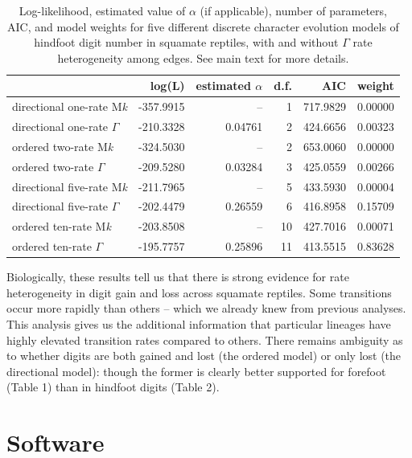 \documentclass[fleqn,10pt,lineno]{wlpeerj} %
\begin{document}
\begin{table}

\caption{\label{tab:unnamed-chunk-13}Log-likelihood, estimated value of $\alpha$ (if applicable), number of parameters, AIC, and model weights for five different discrete character evolution models of hindfoot digit number in squamate reptiles, with and without $\Gamma$ rate heterogeneity among edges. See main text for more details.}
\centering
\begin{tabular}[t]{l|r|r|r|r|r}
\hline
  & log(L) & estimated $\alpha$ & d.f. & AIC & weight\\
\hline
directional one-rate M\emph{k} & -357.9915 & -- & 1 & 717.9829 & 0.00000\\
\hline
directional one-rate $\Gamma$ & -210.3328 & 0.04761 & 2 & 424.6656 & 0.00323\\
\hline
ordered two-rate M\emph{k} & -324.5030 & -- & 2 & 653.0060 & 0.00000\\
\hline
ordered two-rate $\Gamma$ & -209.5280 & 0.03284 & 3 & 425.0559 & 0.00266\\
\hline
directional five-rate M\emph{k} & -211.7965 & -- & 5 & 433.5930 & 0.00004\\
\hline
directional five-rate $\Gamma$ & -202.4479 & 0.26559 & 6 & 416.8958 & 0.15709\\
\hline
ordered ten-rate M\emph{k} & -203.8508 & -- & 10 & 427.7016 & 0.00071\\
\hline
ordered ten-rate $\Gamma$ & -195.7757 & 0.25896 & 11 & 413.5515 & 0.83628\\
\hline
\end{tabular}
\end{table}

Biologically, these results tell us that there is strong evidence for rate heterogeneity in digit gain and loss across squamate reptiles. Some transitions occur more rapidly than others -- which we already knew from previous analyses. This analysis gives us the additional information that particular lineages have highly elevated transition rates compared to others. There remains ambiguity as to whether digits are both gained and lost (the ordered model) or only lost (the directional model): though the former is clearly better supported for forefoot (Table 1) than in hindfoot digits (Table 2).

\section{Software}\label{software}
\end{document}
